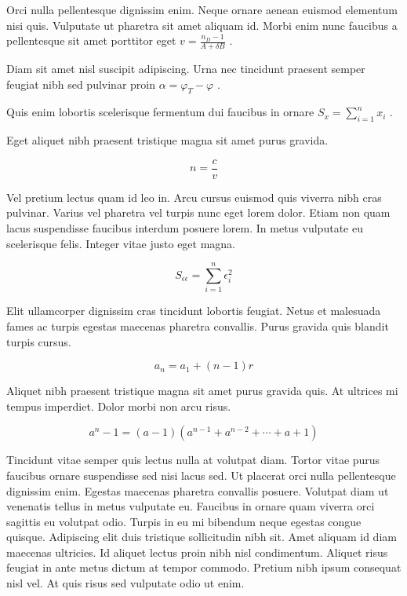 \documentclass{article}
\begin{document}
	
    Orci nulla pellentesque dignissim enim. Neque ornare aenean euismod elementum nisi quis. Vulputate ut pharetra sit amet aliquam id. Morbi enim nunc faucibus a pellentesque sit amet porttitor eget  
    \begin{math}
    	v=\frac{n_D-1}{A+\delta B}
    \end{math}
    .
    \newline
    
   Diam sit amet nisl suscipit adipiscing. Urna nec tincidunt praesent semper feugiat nibh sed pulvinar proin
   $ \alpha=\varphi_T-\varphi $
   .
   \newline
    
    Quis enim lobortis scelerisque fermentum dui faucibus in ornare 
    \( S_x=\sum_{i=1}^{n}x_i \)
    .
    \newline
    
    Eget aliquet nibh praesent tristique magna sit amet purus gravida.
    
    \[ n=\frac{c}{v}  \]
    
    Vel pretium lectus quam id leo in. Arcu cursus euismod quis viverra nibh cras pulvinar. Varius vel pharetra vel turpis nunc eget lorem dolor. Etiam non quam lacus suspendisse faucibus interdum posuere lorem. In metus vulputate eu scelerisque felis. Integer vitae justo eget magna.
    
    $$ S_{\epsilon \epsilon}=\sum_{i=1}^{n}\epsilon_i^2 $$
    
    Elit ullamcorper dignissim cras tincidunt lobortis feugiat. Netus et malesuada fames ac turpis egestas maecenas pharetra convallis. Purus gravida quis blandit turpis cursus. 
    
    \begin{displaymath}
    	a_n=a_1+(n-1)r
    \end{displaymath}
    
    Aliquet nibh praesent tristique magna sit amet purus gravida quis. At ultrices mi tempus imperdiet. Dolor morbi non arcu risus.
    
    \begin{equation}
    	a^n-1=(a-1)(a^{n-1}+a^{n-2}+\cdots+a+1)
    \end{equation}
    
    Tincidunt vitae semper quis lectus nulla at volutpat diam. Tortor vitae purus faucibus ornare suspendisse sed nisi lacus sed. Ut placerat orci nulla pellentesque dignissim enim. Egestas maecenas pharetra convallis posuere. Volutpat diam ut venenatis tellus in metus vulputate eu. Faucibus in ornare quam viverra orci sagittis eu volutpat odio. Turpis in eu mi bibendum neque egestas congue quisque. Adipiscing elit duis tristique sollicitudin nibh sit. Amet aliquam id diam maecenas ultricies. Id aliquet lectus proin nibh nisl condimentum. Aliquet risus feugiat in ante metus dictum at tempor commodo. Pretium nibh ipsum consequat nisl vel. At quis risus sed vulputate odio ut enim.
    
\end{document}
